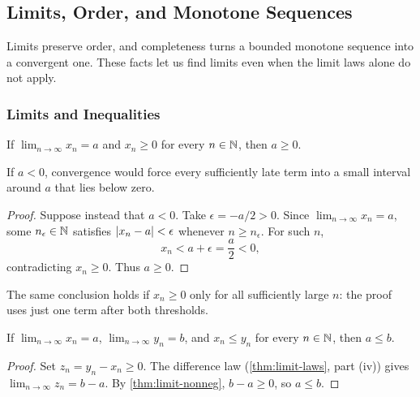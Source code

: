 \subsection{Limits, Order, and Monotone Sequences}
Limits preserve order, and completeness turns a bounded monotone sequence into a convergent one. These facts let us find limits even when the limit laws alone do not apply.

\subsubsection{Limits and Inequalities}
\begin{theorem}\label{thm:limit-nonneg}
    If $\lim_{n\to\infty}x_n=a$ and $x_n\geq0$ for every $n\in\mathbb{N}$, then $a\geq0$.
\end{theorem}
\begin{idea}
    If $a<0$, convergence would force every sufficiently late term into a small interval around $a$ that lies below zero.
\end{idea}
\begin{proof}
    Suppose instead that $a<0$. Take $\epsilon=-a/2>0$. Since $\lim_{n\to\infty}x_n=a$, some $n_\epsilon\in\mathbb{N}$ satisfies $\left|x_n-a\right|<\epsilon$ whenever $n\geq n_\epsilon$. For such $n$,
    \[
        x_n<a+\epsilon=\frac a2<0,
    \]
    contradicting $x_n\geq0$. Thus $a\geq0$.
\end{proof}

The same conclusion holds if $x_n\geq0$ only for all sufficiently large $n$: the proof uses just one term after both thresholds.

\begin{theorem}\label{thm:limits-and-order}
    If $\lim_{n\to\infty}x_n=a$, $\lim_{n\to\infty}y_n=b$, and $x_n\leq y_n$ for every $n\in\mathbb{N}$, then $a\leq b$.
\end{theorem}
\begin{proof}
    Set $z_n=y_n-x_n\geq0$. The difference law (\cref{thm:limit-laws}, part (iv)) gives $\lim_{n\to\infty}z_n=b-a$. By \cref{thm:limit-nonneg}, $b-a\geq0$, so $a\leq b$.
\end{proof}

